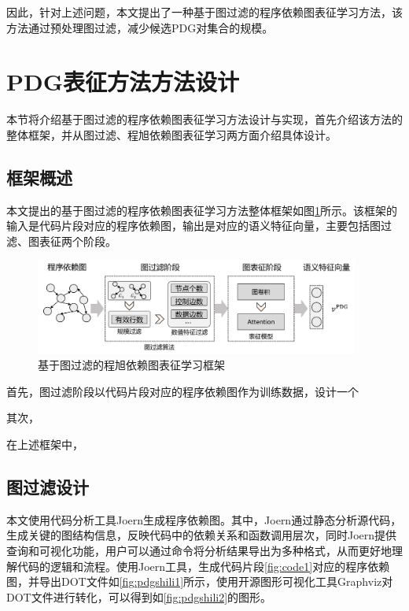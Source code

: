 因此，针对上述问题，本文提出了一种基于图过滤的程序依赖图表征学习方法，该方法通过预处理图过滤，减少候选PDG对集合的规模。

\section{PDG表征方法方法设计}
\label{sec:PDG}
本节将介绍基于图过滤的程序依赖图表征学习方法设计与实现，首先介绍该方法的整体框架，并从图过滤、程旭依赖图表征学习两方面介绍具体设计。 

\subsection{框架概述}
\label{subsec:PDGOverview}
本文提出的基于图过滤的程序依赖图表征学习方法整体框架如图\ref{fig:pdgframework}所示。该框架的输入是代码片段对应的程序依赖图，输出是对应的语义特征向量，主要包括图过滤、图表征两个阶段。

\begin{figure}[H]
  \centering
  \includegraphics[width=0.95\textwidth]{figures/pdgframework.png}
  \caption{基于图过滤的程旭依赖图表征学习框架}\label{fig:pdgframework}
\end{figure}

首先，图过滤阶段以代码片段对应的程序依赖图作为训练数据，设计一个

其次，

在上述框架中，


\subsection{图过滤设计}
\label{subsec:PDGPreModel}

本文使用代码分析工具Joern生成程序依赖图。其中，Joern通过静态分析源代码，生成关键的图结构信息，反映代码中的依赖关系和函数调用层次，同时Joern提供查询和可视化功能，用户可以通过命令将分析结果导出为多种格式，从而更好地理解代码的逻辑和流程。使用Joern工具，生成代码片段\ref{fig:code1}对应的程序依赖图，并导出DOT文件如\ref{fig:pdgshili1}所示，使用开源图形可视化工具Graphviz对DOT文件进行转化，可以得到如\ref{fig:pdgshili2}的图形。

